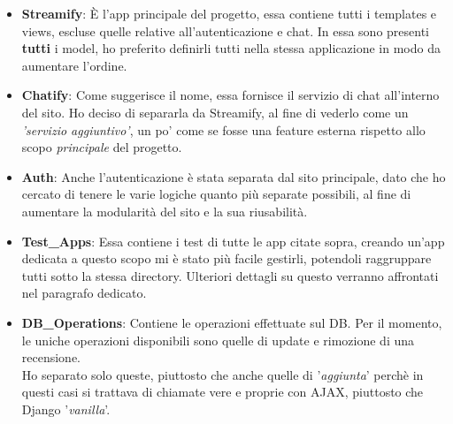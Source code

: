 \documentclass[12pt]{article}
\begin{document}
	\begin{itemize}
		\item \textbf{Streamify}: È l'app principale del progetto, essa contiene tutti i templates e views, escluse quelle relative all'autenticazione e chat. In essa sono presenti \textbf{tutti} i model, ho preferito definirli tutti nella stessa applicazione in modo da aumentare l'ordine. \\
		
		\item \textbf{Chatify}: Come suggerisce il nome, essa fornisce il servizio di chat all'interno del sito. Ho deciso di separarla da Streamify, al fine di vederlo come un \textit{'servizio aggiuntivo'}, un po' come se fosse una feature esterna rispetto allo scopo \textit{principale} del progetto. \\
		
		\item \textbf{Auth}: Anche l'autenticazione è stata separata dal sito principale, dato che ho cercato di tenere le varie logiche quanto più separate possibili, al fine di aumentare la modularità del sito e la sua riusabilità. \\
		
		\item \textbf{Test\_Apps}: Essa contiene i test di tutte le app citate sopra, creando un'app dedicata a questo scopo mi è stato più facile gestirli, potendoli raggruppare tutti sotto la stessa directory. Ulteriori dettagli su questo verranno affrontati nel paragrafo dedicato. \\
		
		\item \textbf{DB\_Operations}: Contiene le operazioni effettuate sul DB. Per il momento, le uniche operazioni disponibili sono quelle di update e rimozione di una recensione. \\ Ho separato solo queste, piuttosto che anche quelle di '\textit{aggiunta}' perchè in questi casi si trattava di chiamate vere e proprie con AJAX, piuttosto che Django '\textit{vanilla}'.
	\end{itemize}
	\pagebreak
	
	
\end{document}
